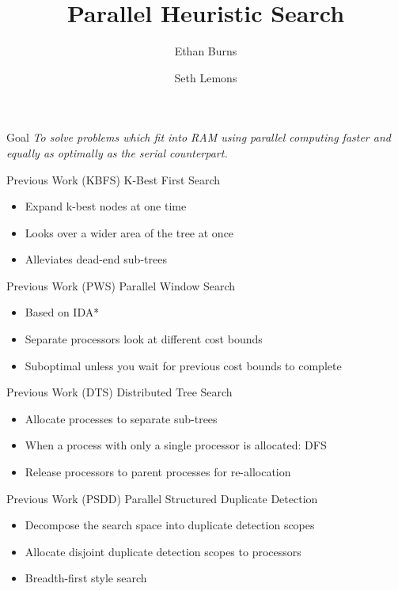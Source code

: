 \documentclass[style=simple]{powerdot}
\title{Parallel Heuristic Search}
\author{Ethan Burns \and Seth Lemons}
\begin{document}
\maketitle

\begin{slide}{Goal}
  \emph{To solve problems which fit into RAM using parallel computing
    faster and equally as optimally as the serial counterpart.}
\end{slide}

\begin{slide}{Previous Work (KBFS)}
  K-Best First Search
  \begin{itemize}
  \item Expand k-best nodes at one time
  \item Looks over a wider area of the tree at once
  \item Alleviates dead-end sub-trees
  \end{itemize}
\end{slide}

\begin{slide}{Previous Work (PWS)}
  Parallel Window Search
  \begin{itemize}
  \item Based on IDA*
  \item Separate processors look at different cost bounds
  \item Suboptimal unless you wait for previous cost bounds to complete
  \end{itemize}
\end{slide}

\begin{slide}{Previous Work (DTS)}
  Distributed Tree Search
  \begin{itemize}
  \item Allocate processes to separate sub-trees
  \item When a process with only a single processor is allocated: DFS
  \item Release processors to parent processes for re-allocation
  \end{itemize}
\end{slide}

\begin{slide}{Previous Work (PSDD)}
  Parallel Structured Duplicate Detection
  \begin{itemize}
  \item Decompose the search space into duplicate detection scopes
  \item Allocate disjoint duplicate detection scopes to processors
  \item Breadth-first style search
  \end{itemize}
\end{slide}
\end{document}

